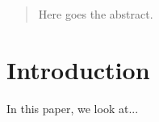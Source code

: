 \begin{abstract}
Here goes the abstract.
\end{abstract}

\section{Introduction}

In this paper, we look at...
